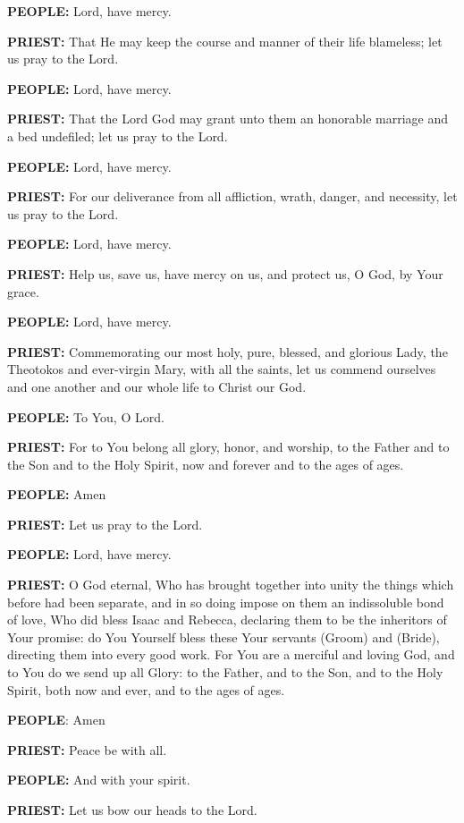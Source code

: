 \textbf{PEOPLE:} Lord, have mercy.

\textbf{PRIEST:} That He may keep the course and manner of their life
blameless; let us pray to the Lord.

\textbf{PEOPLE:} Lord, have mercy.

\textbf{PRIEST:} That the Lord God may grant unto them an honorable
marriage and a bed undefiled; let us pray to the Lord.

\textbf{PEOPLE:} Lord, have mercy.

\textbf{PRIEST:} For our deliverance from all affliction, wrath, danger,
and necessity, let us pray to the Lord.

\textbf{PEOPLE:} Lord, have mercy.

\textbf{PRIEST:} Help us, save us, have mercy on us, and protect us, O
God, by Your grace.

\textbf{PEOPLE:} Lord, have mercy.

\textbf{PRIEST:} Commemorating our most holy, pure, blessed, and
glorious Lady, the Theotokos and ever-virgin Mary, with all the saints,
let us commend ourselves and one another and our whole life to Christ
our God.

\textbf{PEOPLE:} To You, O Lord.

\textbf{PRIEST:} For to You belong all glory, honor, and worship, to the
Father and to the Son and to the Holy Spirit, now and forever and to the
ages of ages.

\textbf{PEOPLE:} Amen

\textbf{PRIEST:} Let us pray to the Lord.

\textbf{PEOPLE:} Lord, have mercy.

\textbf{PRIEST:} O God eternal, Who has brought together into unity the
things which before had been separate, and in so doing impose on them an
indissoluble bond of love, Who did bless Isaac and Rebecca, declaring
them to be the inheritors of Your promise: do You Yourself bless these
Your servants (Groom) and (Bride), directing them into every good work.
For You are a merciful and loving God, and to You do we send up all
Glory: to the Father, and to the Son, and to the Holy Spirit, both now
and ever, and to the ages of ages.

\textbf{PEOPLE}: Amen

\textbf{PRIEST:} Peace be with all.

\textbf{PEOPLE:} And with your spirit.

\textbf{PRIEST:} Let us bow our heads to the Lord.

